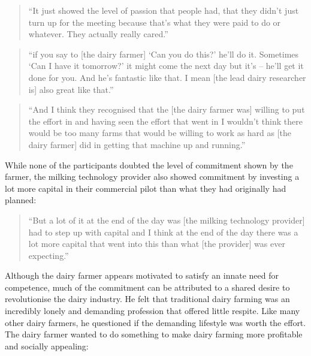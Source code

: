 \begin{quote}
\small
\enquote{It just showed the level of passion that people had, that they didn't just turn up for the meeting because that's what they were paid to do or whatever. They actually really cared.} \\
\end{quote}

\begin{quote}
\small
\enquote{if you say to [the dairy farmer] \enquote{Can you do this?} he'll do it. Sometimes \enquote{Can I have it tomorrow?} it might come the next day but it's – he'll get it done for you. And he’s fantastic like that.  I mean [the lead dairy researcher is] also great like that.} \\
\end{quote}

\begin{quote}
\small
\enquote{And I think they recognised that the [the dairy farmer was] willing to put the effort in and having seen the effort that went in I wouldn't think there would be too many farms that would be willing to work as hard as [the dairy farmer] did in getting that machine up and running.} \\
\end{quote}

While none of the participants doubted the level of commitment shown by the farmer, the milking technology provider also showed commitment by investing a lot more capital in their commercial pilot than what they had originally had planned:

\begin{quote}
\small
\enquote{But a lot of it at the end of the day was [the milking technology provider] had to step up with capital and I think at the end of the day there was a lot more capital that went into this than what [the provider] was ever expecting.} \\
\end{quote}

Although the dairy farmer appears motivated to satisfy an innate need for competence, much of the commitment can be attributed to a shared desire to revolutionise the dairy industry. He felt that traditional dairy farming was an incredibly lonely and demanding profession that offered little respite. Like many other dairy farmers, he questioned if the demanding lifestyle was worth the effort. The dairy farmer wanted to do something to make dairy farming more profitable and socially appealing:


